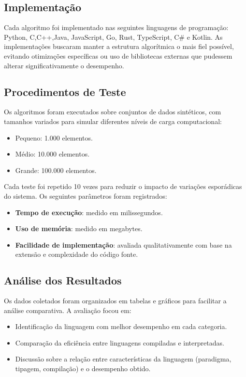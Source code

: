 \documentclass[12pt,oneside,a4paper]{report}
\begin{document}
\subsection{Implementação}

Cada algoritmo foi implementado nas seguintes linguagens de programação:
Python, C,C++,Java, JavaScript, Go, Rust, TypeScript, C\# e Kotlin.  
As implementações buscaram manter a estrutura algorítmica o mais fiel possível, evitando otimizações específicas ou uso de bibliotecas externas que pudessem alterar significativamente o desempenho.

\subsection{Procedimentos de Teste}

Os algoritmos foram executados sobre conjuntos de dados sintéticos, com tamanhos variados para simular diferentes níveis de carga computacional:

\begin{itemize}
    \item Pequeno: 1.000 elementos.
    \item Médio: 10.000 elementos.
    \item Grande: 100.000 elementos.
\end{itemize}

Cada teste foi repetido 10 vezes para reduzir o impacto de variações esporádicas do sistema. Os seguintes parâmetros foram registrados:

\begin{itemize}
    \item \textbf{Tempo de execução}: medido em milissegundos.
    \item \textbf{Uso de memória}: medido em megabytes.
    \item \textbf{Facilidade de implementação}: avaliada qualitativamente com base na extensão e complexidade do código fonte.
\end{itemize}

\subsection{Análise dos Resultados}

Os dados coletados foram organizados em tabelas e gráficos para facilitar a análise comparativa. A avaliação focou em:

\begin{itemize}
    \item Identificação da linguagem com melhor desempenho em cada categoria.
    \item Comparação da eficiência entre linguagens compiladas e interpretadas.
    \item Discussão sobre a relação entre características da linguagem (paradigma, tipagem, compilação) e o desempenho obtido.
\end{itemize}
\end{document}
